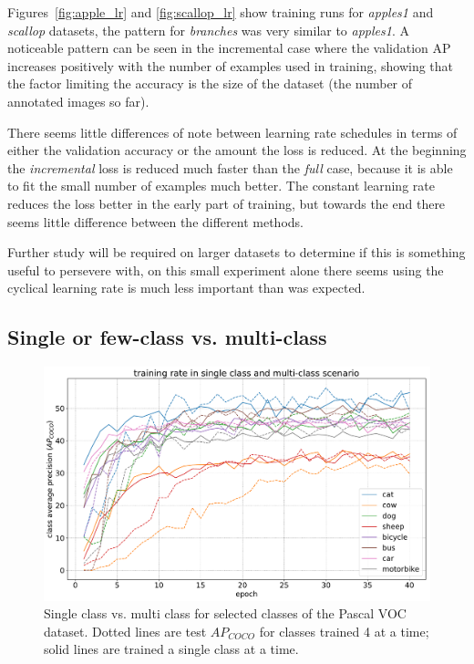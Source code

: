 Figures~\ref{fig:apple_lr} and \ref{fig:scallop_lr} show training runs for \emph{apples1} and \emph{scallop} datasets, the pattern for \emph{branches} was very similar to \emph{apples1}. A noticeable pattern can be seen in the incremental case where the validation \gls{AP} increases positively with the number of examples used in training, showing that the factor limiting the accuracy is the size of the dataset (the number of annotated images so far).

There seems little differences of note between learning rate schedules in terms of either the validation accuracy or the amount the loss is reduced. At the beginning the \emph{incremental} loss is reduced much faster than the \emph{full} case, because it is able to fit the small number of examples much better. The constant learning rate reduces the loss better in the early part of training, but towards the end there seems little difference between the different methods. 

Further study will be required on larger datasets to determine if this is something useful to persevere with, on this small experiment alone there seems using the cyclical learning rate is much less important than was expected.

\subsection{Single or few-class vs. multi-class}
\label{sec:multiclass}

\begin{figure}[h]
  \centering
  \includegraphics[width=1.0\linewidth]{charts/training/multiclass.pdf}
  \caption{Single class vs. multi class for selected classes of the Pascal VOC dataset. Dotted lines are test $AP_{COCO}$ for classes trained 4 at a time; solid lines are trained a single class at a time. }  
  \label{fig:multiclass}
\end{figure}

